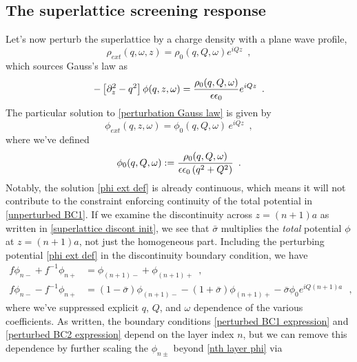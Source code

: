 \subsection{The superlattice screening response}

Let's now perturb the superlattice by a charge density with a plane wave profile,
\begin{equation}
    \label{rho ext}
    \rho_{ext}(q,\omega,z) = \rho_0(q,Q,\omega) e^{i Q z}
    \,\,\,,
\end{equation}
which sources Gauss's law as
\begin{equation}
    \label{perturbation Gauss law}
    -\left[\partial_z^2-q^2\right]\phi(q,z,\omega) = \frac{\rho_0(q,Q,\omega)}{\epsilon\epsilon_0} e^{i Q z}
    \,\,\,.
\end{equation}
The particular solution to \eqref{perturbation Gauss law} is given by
\begin{equation}
    \label{phi ext def}
    \phi_{ext}(q,z,\omega) = \phi_0(q,Q,\omega)\, e^{i Q z}
    \,\,\,,
\end{equation}
where we've defined
\begin{equation}
    \label{phi0 def}
    \phi_0(q,Q,\omega) := \frac{\rho_0(q,Q,\omega)}{\epsilon\epsilon_0\left( q^2+Q^2\right)}
    \,\,\,.
\end{equation}
Notably, the solution \eqref{phi ext def} is already continuous, which means it will not contribute to the constraint enforcing continuity of the total potential in \eqref{unperturbed BC1}.  If we examine the discontinuity across $z=(n+1)a$ as written in \eqref{superlattice discont init}, we see that $\bar\sigma$ multiplies the {\it total} potential $\phi$ at $z=(n+1)a$, not just the homogeneous part.  Including the perturbing potential \eqref{phi ext def} in the discontinuity boundary condition, we have
\begin{align}
    \label{perturbed BC1 expression}
    f \phi_{n-} + f^{-1}\phi_{n+} &= \phi_{(n+1)-} + \phi_{(n+1)+}
    \,\,\,,
    \\
    \label{perturbed BC2 expression}
    f \phi_{n-} - f^{-1}\phi_{n+} &= (1-\bar\sigma)\phi_{(n+1)-}-(1+\bar\sigma)\phi_{(n+1)+} - \bar\sigma \phi_0 e^{i Q(n+1)a}
    \,\,\,\,,
\end{align}
where we've suppressed explicit $q$, $Q$, and $\omega$ dependence of the various coefficients.  As written, the boundary conditions \eqref{perturbed BC1 expression} and \eqref{perturbed BC2 expression} depend on the layer index $n$, but we can remove this dependence by further scaling the $\phi_{n\pm}$ beyond \eqref{nth layer phi} via
